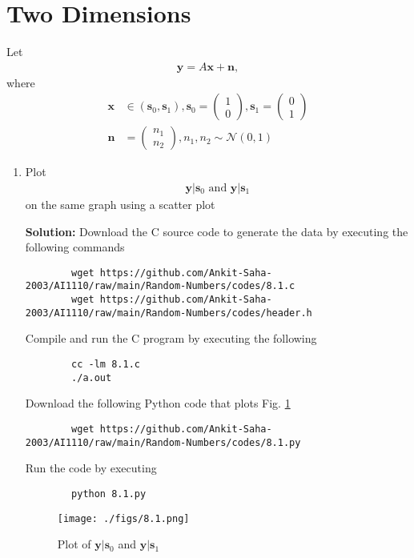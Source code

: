 \documentclass[journal,12pt,twocolumn]{IEEEtran}
\newcommand{\solution}{\noindent \textbf{Solution: }}
\providecommand{\brak}[1]{\ensuremath{\left(#1\right)}}
\providecommand{\gauss}[2]{\mathcal{N}\ensuremath{\left(#1,#2\right)}}
\providecommand{\mbf}{\mathbf}
\let\vec\mathbf
\numberwithin{equation}{section}
\renewcommand\thesection{\arabic{section}}
\newcommand{\myvec}[1]{\ensuremath{\begin{pmatrix}#1\end{pmatrix}}}
\begin{document}
	\section{Two Dimensions}
	Let 
	\begin{align}
		\vec{y} = A\vec{x} + \vec{n},
	\end{align}
	where 
	\begin{align}
		\vec{x} &\in \brak{\vec{s}_0,\vec{s}_1}, 
		\vec{s}_0 = \myvec{1 \\ 0},
		\vec{s}_1 = \myvec{0 \\ 1} \\
		\vec{n} &= \myvec{n_1 \\ n_2},
		n_1,n_2 \sim \gauss{0}{1}
	\end{align}
	
	\begin{enumerate}[label=\thesection.\arabic*,ref=\thesection.\theenumi]
	\item Plot 
	\begin{align}
		\vec{y}|\vec{s}_0 \text{ and } \vec{y}|\vec{s}_1
	\end{align}
	on the same graph using a scatter plot
	
	\solution Download the C source code to generate the data by executing the following commands
	\begin{lstlisting}
		wget https://github.com/Ankit-Saha-2003/AI1110/raw/main/Random-Numbers/codes/8.1.c
		wget https://github.com/Ankit-Saha-2003/AI1110/raw/main/Random-Numbers/codes/header.h
	\end{lstlisting}
	Compile and run the C program by executing the following
	\begin{lstlisting}
		cc -lm 8.1.c
		./a.out
	\end{lstlisting}
	
	Download the following Python code that plots Fig. \ref{fig-8.1} 
	\begin{lstlisting}
		wget https://github.com/Ankit-Saha-2003/AI1110/raw/main/Random-Numbers/codes/8.1.py
	\end{lstlisting}
	Run the code by executing
	\begin{lstlisting}
		python 8.1.py
	\end{lstlisting}
	
	\begin{figure}
		\centering
		\texttt{[image: ./figs/8.1.png]}
		\caption{Plot of $\mbf{y}|\mbf{s}_0$ and $\mbf{y}|\mbf{s}_1$}
		\label{fig-8.1}
	\end{figure}
	

\end{enumerate}
\end{document}
